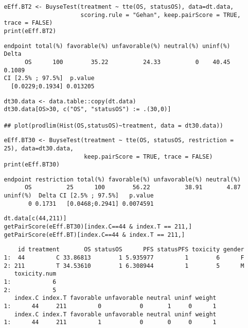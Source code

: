 \documentclass[12pt]{article}
\begin{document}
\lstset{language=r,label= ,caption= ,captionpos=b,numbers=none}
\begin{lstlisting}
eEff.BT2 <- BuyseTest(treatment ~ tte(OS, statusOS), data=dt.data,
                      scoring.rule = "Gehan", keep.pairScore = TRUE, trace = FALSE)
print(eEff.BT2)
\end{lstlisting}

\begin{verbatim}
endpoint total(%) favorable(%) unfavorable(%) neutral(%) uninf(%)  Delta
      OS      100        35.22          24.33          0    40.45 0.1089
CI [2.5% ; 97.5%]  p.value
  [0.0229;0.1934] 0.013205
\end{verbatim}


\lstset{language=r,label= ,caption= ,captionpos=b,numbers=none}
\begin{lstlisting}
dt30.data <- data.table::copy(dt.data)
dt30.data[OS>30, c("OS", "statusOS") := .(30,0)]

## plot(prodlim(Hist(OS,statusOS)~treatment, data = dt30.data))
\end{lstlisting}

\lstset{language=r,label= ,caption= ,captionpos=b,numbers=none}
\begin{lstlisting}
eEff.BT30 <- BuyseTest(treatment ~ tte(OS, statusOS, restriction = 25), data=dt30.data,
                       keep.pairScore = TRUE, trace = FALSE)
print(eEff.BT30)
\end{lstlisting}

\begin{verbatim}
endpoint restriction total(%) favorable(%) unfavorable(%) neutral(%)
      OS          25      100        56.22          38.91       4.87
uninf(%)  Delta CI [2.5% ; 97.5%]   p.value
       0 0.1731   [0.0468;0.2941] 0.0074591
\end{verbatim}


\lstset{language=r,label= ,caption= ,captionpos=b,numbers=none}
\begin{lstlisting}
dt.data[c(44,211)]
getPairScore(eEff.BT30)[index.C==44 & index.T == 211,]
getPairScore(eEff.BT)[index.C==44 & index.T == 211,]
\end{lstlisting}

\begin{verbatim}
    id treatment       OS statusOS      PFS statusPFS toxicity gender
1:  44         C 33.86813        1 5.935977         1        6      F
2: 211         T 34.53610        1 6.308944         1        5      M
   toxicity.num
1:            6
2:            5
   index.C index.T favorable unfavorable neutral uninf weight
1:      44     211         0           0       1     0      1
   index.C index.T favorable unfavorable neutral uninf weight
1:      44     211         1           0       0     0      1
\end{verbatim}
\end{document}
